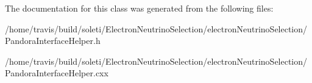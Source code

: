 The documentation for this class was generated from the following files\-:\begin{DoxyCompactItemize}
\item 
/home/travis/build/soleti/\-Electron\-Neutrino\-Selection/electron\-Neutrino\-Selection/Pandora\-Interface\-Helper.\-h\item 
/home/travis/build/soleti/\-Electron\-Neutrino\-Selection/electron\-Neutrino\-Selection/Pandora\-Interface\-Helper.\-cxx\end{DoxyCompactItemize}
